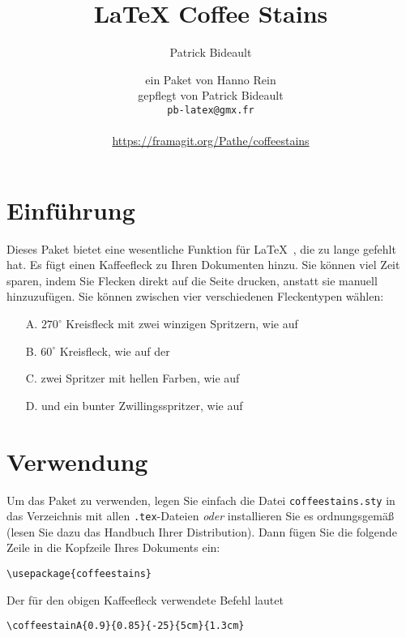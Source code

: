 \documentclass[a4paper, 11pt, BCOR = 0 pt, oneside]{scrartcl}
\author{Patrick Bideault}
\begin{document}
\title{LaTeX Coffee Stains}
\author{ein Paket von Hanno Rein\\
gepflegt von Patrick Bideault\\%
  \texttt{pb-latex@gmx.fr}\\
  ~\\
  \url{https://framagit.org/Pathe/coffeestains}}
\renewcommand{\today}{Version \gitRel{} -- \DTMtoday{}}
\maketitle

\label{stainA}
\section{Einführung}
Dieses Paket bietet eine wesentliche Funktion für \LaTeX~, die zu lange gefehlt
hat. Es fügt einen Kaffeefleck zu Ihren Dokumenten hinzu. Sie können viel Zeit
sparen, indem Sie Flecken direkt auf die Seite drucken, anstatt sie manuell
hinzuzufügen. Sie können zwischen vier verschiedenen Fleckentypen wählen:
\begin{itemize}
\item[A.] $270^\circ$ Kreisfleck mit zwei winzigen Spritzern, wie auf 
  \item[B.] $60^\circ$ Kreisfleck, wie auf der 
  \item[C.] zwei Spritzer mit hellen Farben, wie auf 
  \item[D.] und ein bunter Zwillingsspritzer, wie auf 
\end{itemize}

\section{Verwendung}
Um das Paket zu verwenden, legen Sie einfach die Datei \texttt{coffeestains.sty} in das Verzeichnis mit allen \texttt{.tex}-Dateien \emph{oder} installieren Sie es ordnungsgemäß (lesen Sie dazu das Handbuch Ihrer Distribution). Dann fügen Sie die folgende Zeile in die Kopfzeile Ihres Dokuments ein:
\begin{verbatim}
\usepackage{coffeestains}
\end{verbatim}

\vfill{}

\begin{tcolorbox}
Der für den obigen Kaffeefleck verwendete Befehl lautet

  \verb|\coffeestainA{0.9}{0.85}{-25}{5cm}{1.3cm}|
\end{tcolorbox}
\newpage{}
\label{stainB}
\end{document}
